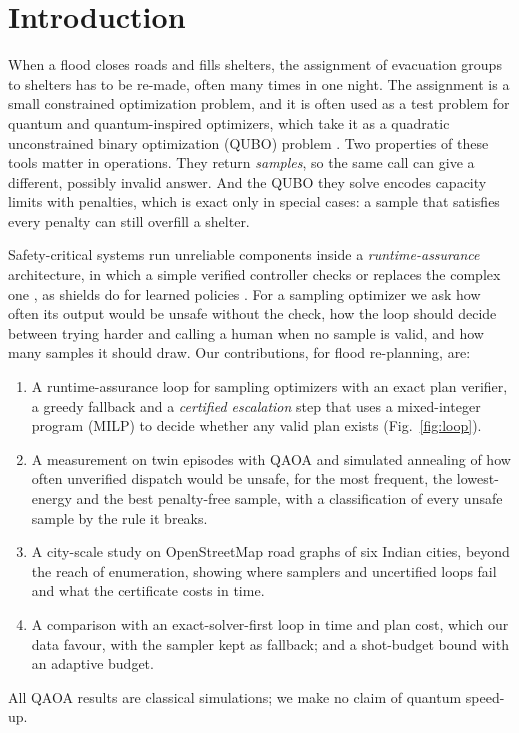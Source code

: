 \documentclass[conference]{IEEEtran}
\begin{document}
\section{Introduction}
When a flood closes roads and fills shelters, the assignment of evacuation groups to shelters has to be re-made, often many times in one night. The assignment is a small constrained optimization problem, and it is often used as a test problem for quantum and quantum-inspired optimizers, which take it as a quadratic unconstrained binary optimization (QUBO) problem \cite{Lucas2014,Glover2019,Cadelina2024,Abbas2024}. Two properties of these tools matter in operations. They return \emph{samples}, so the same call can give a different, possibly invalid answer. And the QUBO they solve encodes capacity limits with penalties, which is exact only in special cases: a sample that satisfies every penalty can still overfill a shelter.

Safety-critical systems run unreliable components inside a \emph{runtime-assurance} architecture, in which a simple verified controller checks or replaces the complex one \cite{Sha2001,Desai2019}, as shields do for learned policies \cite{Alshiekh2018}. For a sampling optimizer we ask how often its output would be unsafe without the check, how the loop should decide between trying harder and calling a human when no sample is valid, and how many samples it should draw. Our contributions, for flood re-planning, are:
\begin{enumerate}
\item A runtime-assurance loop for sampling optimizers with an exact plan verifier, a greedy fallback and a \emph{certified escalation} step that uses a mixed-integer program (MILP) to decide whether any valid plan exists (Fig.~\ref{fig:loop}).
\item A measurement on twin episodes with QAOA \cite{Farhi2014,Hadfield2019} and simulated annealing \cite{Kirkpatrick1983} of how often unverified dispatch would be unsafe, for the most frequent, the lowest-energy and the best penalty-free sample, with a classification of every unsafe sample by the rule it breaks.
\item A city-scale study on OpenStreetMap road graphs of six Indian cities, beyond the reach of enumeration, showing where samplers and uncertified loops fail and what the certificate costs in time.
\item A comparison with an exact-solver-first loop in time and plan cost, which our data favour, with the sampler kept as fallback; and a shot-budget bound with an adaptive budget.
\end{enumerate}
All QAOA results are classical simulations; we make no claim of quantum speed-up.
\end{document}
